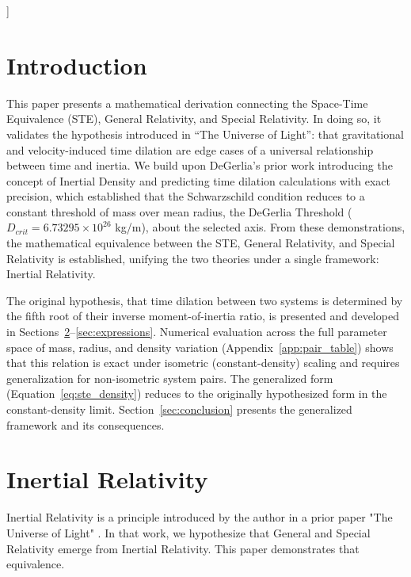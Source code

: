 \documentclass[twoside,twocolumn,9pt]{article}
\begin{document}
  ]

\renewcommand*\rmdefault{bch}\normalfont\upshape
\rmfamily
\vspace{-1cm}
\section{Introduction}
This paper presents a mathematical derivation connecting the Space-Time Equivalence (STE), General Relativity\citep{einstein1915}, and Special Relativity\citep{einstein1905}. In doing so, it validates the hypothesis introduced in ``The Universe of Light''\citep{degerlia202501}: that gravitational and velocity-induced time dilation are edge cases of a universal relationship between time and inertia. We build upon DeGerlia's prior work introducing the concept of Inertial Density and predicting time dilation calculations with exact precision\citep{degerlia202505}, which established that the Schwarzschild condition reduces to a constant threshold of mass over mean radius, the DeGerlia Threshold ($D_{crit} = 6.73295 \times 10^{26}$ kg/m), about the selected axis. From these demonstrations, the mathematical equivalence between the STE, General Relativity, and Special Relativity is established, unifying the two theories under a single framework: Inertial Relativity.

The original hypothesis, that time dilation between two systems is determined by the fifth root of their inverse moment-of-inertia ratio, is presented and developed in Sections~\ref{sec:inertial_relativity}--\ref{sec:expressions}. Numerical evaluation across the full parameter space of mass, radius, and density variation (Appendix~\ref{app:pair_table}) shows that this relation is exact under isometric (constant-density) scaling and requires generalization for non-isometric system pairs. The generalized form (Equation~\ref{eq:ste_density}) reduces to the originally hypothesized form in the constant-density limit. Section~\ref{sec:conclusion} presents the generalized framework and its consequences.

\section{Inertial Relativity}\label{sec:inertial_relativity}
Inertial Relativity is a principle introduced by the author in a prior paper "The Universe of Light" \citep{degerlia202501}. In that work, we hypothesize that General and Special Relativity emerge from Inertial Relativity. This paper demonstrates that equivalence.
\end{document}
